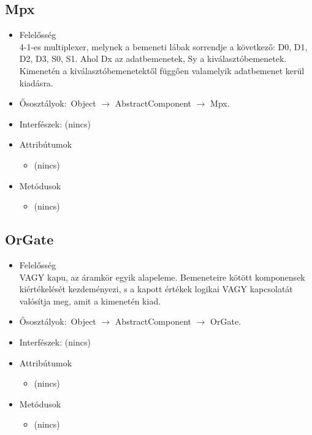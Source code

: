 \subsection{Mpx}
\begin{itemize}
\item Felelősség\\
4-1-es multiplexer, melynek a bemeneti lábak sorrendje a következő:  D0, D1, D2, D3, S0, S1. Ahol Dx az adatbemenetek, Sy a kiválasztóbemenetek.  Kimenetén a kiválasztóbemenetektől függően valamelyik adatbemenet kerül kiadásra.
\item Ősosztályok:\ Object $\rightarrow{}$ AbstractComponent $\rightarrow{}$ Mpx.
\item Interfészek: (nincs)
\item Attribútumok $\ $
\begin{itemize}
\item (nincs)
\end{itemize}
\item Metódusok$\ $
\begin{itemize}
\item (nincs)
\end{itemize}
\end{itemize}

\subsection{OrGate}
\begin{itemize}
\item Felelősség\\
VAGY kapu, az áramkör egyik alapeleme. Bemeneteire kötött komponensek  kiértékelését kezdeményezi, s a kapott értékek logikai VAGY kapcsolatát  valósítja meg, amit a kimenetén kiad.
\item Ősosztályok:\ Object $\rightarrow{}$ AbstractComponent $\rightarrow{}$ OrGate.
\item Interfészek: (nincs)
\item Attribútumok $\ $
\begin{itemize}
\item (nincs)
\end{itemize}
\item Metódusok$\ $
\begin{itemize}
\item (nincs)
\end{itemize}
\end{itemize}

